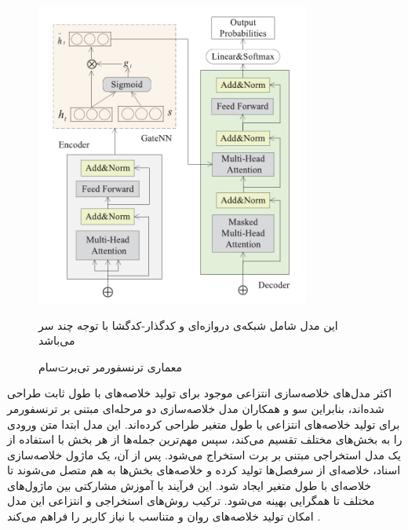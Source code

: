 \begin{figure}[!h]
	\begin{center}
		\includegraphics[height=10cm]{tbertsum_transformer.png}
	\end{center}
	\caption{ معماری ترنسفورمر تی‌برت‌سام \cite{Ma2022TBERTSumTT}}
	\label{fig:tBert_transformer}
	\medskip
	\small
	\centerline{	این مدل شامل شبکه‌ی دروازه‌ای و کدگذار-کدگشا با توجه چند سر می‌باشد \cite{Ma2022TBERTSumTT}}
	
\end{figure}

اکثر مدل‌های خلاصه‌سازی انتزاعی موجود برای تولید خلاصه‌های با طول ثابت طراحی شده‌اند، بنابراین سو
و همکاران مدل خلاصه‌سازی دو مرحله‌ای مبتنی بر ترنسفورمر برای تولید خلاصه‌های انتزاعی با طول متغیر طراحی کرده‌اند. این مدل ابتدا متن ورودی را به بخش‌های مختلف تقسیم می‌کند، سپس مهم‌ترین جمله‌ها از هر بخش با استفاده از یک مدل استخراجی مبتنی بر برت استخراج می‌شود. پس از آن، یک ماژول خلاصه‌سازی اسناد، خلاصه‌ای از سرفصل‌ها تولید کرده و خلاصه‌های بخش‌ها به هم متصل می‌شوند تا خلاصه‌ای با طول متغیر ایجاد شود. این فرآیند با آموزش مشارکتی بین ماژول‌های مختلف تا همگرایی بهینه می‌شود. ترکیب روش‌های استخراجی و انتزاعی این مدل امکان تولید خلاصه‌های روان و متناسب با نیاز کاربر را فراهم می‌کند \cite{twostage}.






